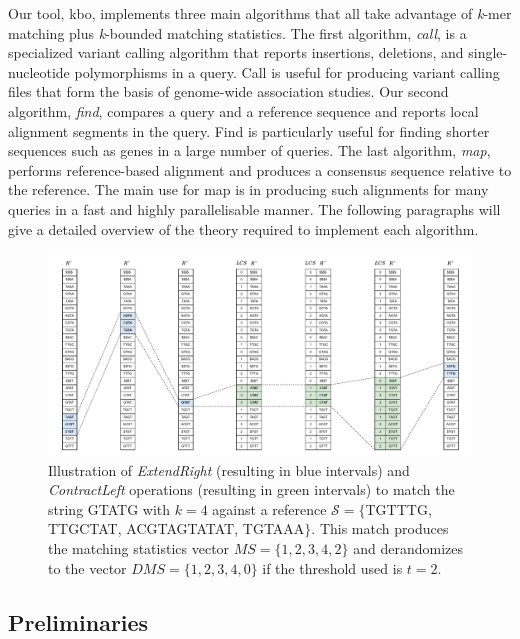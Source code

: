 \documentclass[unnumsec,webpdf,contemporary,large]{oup-authoring-template}%
\theoremstyle{thmstyleone}%
\theoremstyle{thmstyletwo}%
\theoremstyle{thmstylethree}%
\begin{document}
Our tool, {\sf kbo}, implements three main algorithms that all take advantage of \emph{k}-mer matching plus \emph{k}-bounded matching statistics. The first algorithm, \textit{call}, is a specialized variant calling algorithm that reports insertions, deletions, and single-nucleotide polymorphisms in a query. Call is useful for producing variant calling files that form the basis of genome-wide association studies. Our second algorithm, \textit{find}, compares a query and a reference sequence and reports local alignment segments in the query. Find is particularly useful for finding shorter sequences such as genes in a large number of queries. The last algorithm, \textit{map}, performs reference-based alignment and produces a consensus sequence relative to the reference. The main use for map is in producing such alignments for many queries in a fast and highly parallelisable manner. The following paragraphs will give a detailed overview of the theory required to implement each algorithm.

\begin{figure}[b]
    \centering
    \includegraphics[scale=0.6]{fig/SBWT_search_LCS.drawio.pdf}
    \caption{Illustration of {\em ExtendRight} (resulting in blue intervals) and {\em ContractLeft} operations (resulting in green intervals) to match the string {\sf GTATG} with $k=4$ against a reference $\mathcal{S}= \{${\sf TGTTTG}, {\sf TTGCTAT}, {\sf ACGTAGTATAT}, {\sf TGTAAA}$\}$. This match produces the matching statistics vector $MS=\{ 1, 2, 3, 4, 2 \}$ and derandomizes to the vector $DMS=\{ 1, 2, 3, 4, 0 \}$ if the threshold used is $t = 2$.
    }
    \label{fig:sbwt-search}
\end{figure}

\subsection{Preliminaries}\label{preliminaries}
\end{document}
